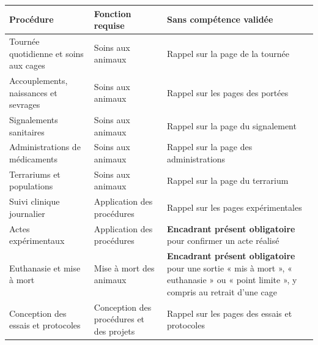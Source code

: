 \documentclass[11pt,a4paper]{article}
\begin{document}
\begin{center}
\small
{}
\begin{tabularx}{\textwidth}{@{}>{\raggedright\arraybackslash}p{5.2cm}>{\raggedright\arraybackslash}p{3.6cm}X@{}}
\toprule
\textbf{Procédure} & \textbf{Fonction requise} & \textbf{Sans compétence validée}\\
\midrule
Tournée quotidienne et soins aux cages & Soins aux animaux & Rappel sur la page de la tournée\\
Accouplements, naissances et sevrages & Soins aux animaux & Rappel sur les pages des portées\\
Signalements sanitaires & Soins aux animaux & Rappel sur la page du signalement\\
Administrations de médicaments & Soins aux animaux & Rappel sur la page des administrations\\
Terrariums et populations & Soins aux animaux & Rappel sur la page du terrarium\\
Suivi clinique journalier & Application des procédures & Rappel sur les pages expérimentales\\
Actes expérimentaux & Application des procédures & \textbf{Encadrant présent obligatoire} pour confirmer un acte réalisé\\
Euthanasie et mise à mort & Mise à mort des animaux & \textbf{Encadrant présent obligatoire} pour une sortie « mis à mort », « euthanasie » ou « point limite », y compris au retrait d'une cage\\
Conception des essais et protocoles & Conception des procédures et des projets & Rappel sur les pages des essais et protocoles\\
\bottomrule
\end{tabularx}
\end{center}
\end{document}
